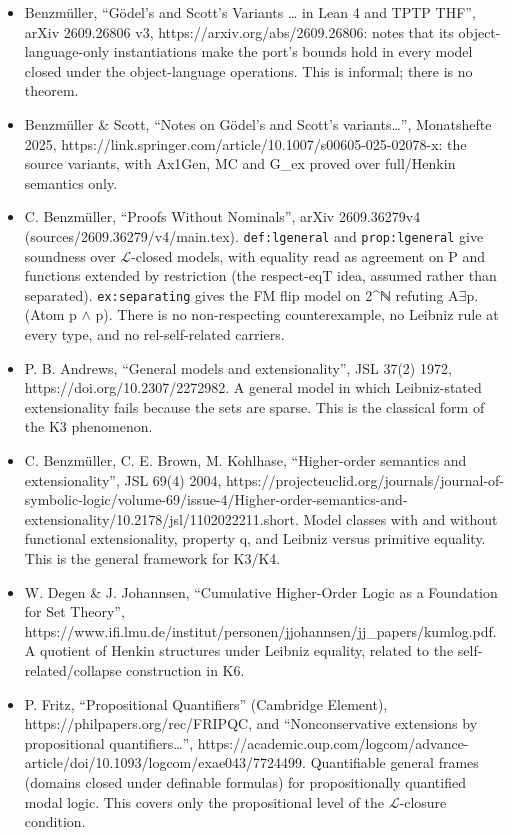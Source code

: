 \documentclass{article}
\begin{document}
\begin{itemize}
\item Benzmüller, ``Gödel's and Scott's Variants \ldots{} in Lean 4 and TPTP THF'', arXiv 2609.26806 v3, https://arxiv.org/abs/2609.26806: notes that its object-language-only instantiations make the port's bounds hold in every model closed under the object-language operations. This is informal; there is no theorem.
\item Benzmüller \& Scott, ``Notes on Gödel's and Scott's variants\ldots{}'', Monatshefte 2025, https://link.springer.com/article/10.1007/s00605-025-02078-x: the source variants, with Ax1Gen, MC and G\_ex proved over full/Henkin semantics only.
\item C. Benzmüller, ``Proofs Without Nominals'', arXiv 2609.36279v4 (sources/2609.36279/v4/main.tex). \texttt{def:lgeneral} and \texttt{prop:lgeneral} give soundness over $\mathcal{L}$-closed models, with equality read as agreement on P and functions extended by restriction (the respect-eqT idea, assumed rather than separated). \texttt{ex:separating} gives the FM flip model on 2\textasciicircum{}ℕ refuting A$\exists$p.(Atom p $\wedge$ p). There is no non-respecting counterexample, no Leibniz rule at every type, and no rel-self-related carriers.
\item P. B. Andrews, ``General models and extensionality'', JSL 37(2) 1972, https://doi.org/10.2307/2272982. A general model in which Leibniz-stated extensionality fails because the sets are sparse. This is the classical form of the K3 phenomenon.
\item C. Benzmüller, C. E. Brown, M. Kohlhase, ``Higher-order semantics and extensionality'', JSL 69(4) 2004, https://projecteuclid.org/journals/journal-of-symbolic-logic/volume-69/issue-4/Higher-order-semantics-and-extensionality/10.2178/jsl/1102022211.short. Model classes with and without functional extensionality, property q, and Leibniz versus primitive equality. This is the general framework for K3/K4.
\item W. Degen \& J. Johannsen, ``Cumulative Higher-Order Logic as a Foundation for Set Theory'', https://www.ifi.lmu.de/institut/personen/jjohannsen/jj\_papers/kumlog.pdf. A quotient of Henkin structures under Leibniz equality, related to the self-related/collapse construction in K6.
\item P. Fritz, ``Propositional Quantifiers'' (Cambridge Element), https://philpapers.org/rec/FRIPQC, and ``Nonconservative extensions by propositional quantifiers\ldots{}'', https://academic.oup.com/logcom/advance-article/doi/10.1093/logcom/exae043/7724499. Quantifiable general frames (domains closed under definable formulas) for propositionally quantified modal logic. This covers only the propositional level of the $\mathcal{L}$-closure condition.

\end{itemize}
\end{document}
